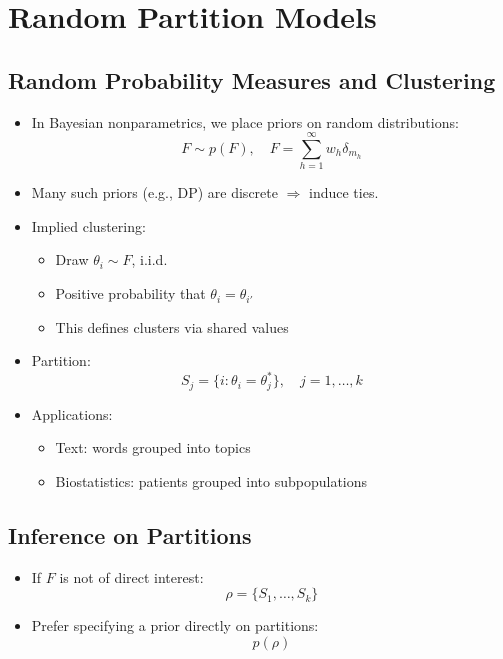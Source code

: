 \documentclass[12pt,oneside]{book}
\numberwithin{equation}{section}
\theoremstyle{definition}
\theoremstyle{plain}
\theoremstyle{remark}
\begin{document}
\section{Random Partition Models}

\subsection*{Random Probability Measures and Clustering}

\begin{itemize}
\item In Bayesian nonparametrics, we place priors on random distributions:
\[
F \sim p(F), \quad F = \sum_{h=1}^{\infty} w_h \delta_{m_h}
\]

\item Many such priors (e.g., DP) are discrete $\Rightarrow$ induce ties.

\item Implied clustering:
\begin{itemize}
\item Draw $\theta_i \sim F$, i.i.d.
\item Positive probability that $\theta_i = \theta_{i'}$
\item This defines clusters via shared values
\end{itemize}

\item Partition:
\[
S_j = \{i : \theta_i = \theta_j^*\}, \quad j = 1,\dots,k
\]

\item Applications:
\begin{itemize}
\item Text: words grouped into topics
\item Biostatistics: patients grouped into subpopulations
\end{itemize}
\end{itemize}

\subsection{Inference on Partitions}

\begin{itemize}
\item If $F$ is not of direct interest:
\[
\rho = \{S_1,\dots,S_k\}
\]

\item Prefer specifying a prior directly on partitions:
\[
p(\rho)
\]
\end{itemize}
\end{document}
